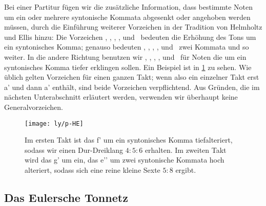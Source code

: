 \documentclass[ngerman,11pt]{scrartcl}
\begin{document}
Bei einer Partitur fügen wir die zusätzliche Information, dass bestimmte Noten
um ein oder mehrere syntonische Kommata abgesenkt oder angehoben werden müssen,
durch die Einführung weiterer Vorzeichen in der Tradition von Helmholtz und
Ellis \cite{HE} hinzu: Die Vorzeichen \dsharpp, \sharpp, \naturalp, \flatp, und
\dflatp\ bedeuten die Erhöhung des Tons um ein syntonisches Komma; genauso
bedeuten \dsharppp, \sharppp, \naturalpp, \flatpp, und \dflatpp\ zwei Kommata
und so weiter. In die andere Richtung benutzen wir \dsharpm, \sharpm, \naturalm,
\flatm, und \dflatm\ für Noten die um ein syntonisches Komma tiefer erklingen
sollen. Ein Beispiel ist in \cref{fig:HE} zu sehen. Wie üblich gelten Vorzeichen
für einen ganzen Takt; wenn also ein einzelner Takt erst \naturalm a' und dann
\natural a' enthält, sind beide Vorzeichen verpflichtend. Aus Gründen, die im
nächsten Unterabschnitt erläutert werden, verwenden wir überhaupt keine
Generalvorzeichen.

\begin{figure}\centering
  \texttt{[image: ly/p-HE]}
  \caption{Im ersten Takt ist das \sharp f’ um ein syntonisches Komma 
    tiefalteriert, sodass wir einen Dur-Dreiklang $4:5:6$ erhalten. Im zweiten
    Takt wird das g’ um ein, das \flat e’’ um zwei syntonische Kommata hoch
    alteriert, sodass sich eine reine kleine Sexte $5:8$ ergibt.}\label{fig:HE}
\end{figure}

\subsection{Das Eulersche Tonnetz}
\end{document}
